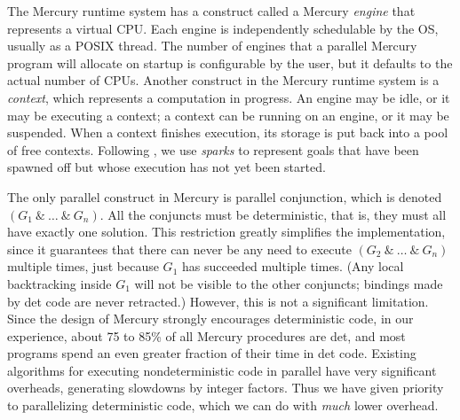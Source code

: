 The Mercury runtime system has a construct called a Mercury \emph{engine}
that represents a virtual CPU.
Each engine is independently schedulable by the OS, usually as a POSIX thread.
The number of engines that a parallel Mercury program will allocate on startup
is configurable by the user,
but it defaults to the actual number of CPUs.
Another construct in the Mercury runtime system is a \emph{context},
which represents a computation in progress.
An engine may be idle, or it may be executing a context;
a context can be running on an engine, or it may be suspended.
When a context finishes execution,
its storage is put back into a pool of free contexts.
Following \cite{simonmar_2009_multicore_rts},
we use \emph{sparks} to represent goals that have been spawned off
but whose execution has not yet been started.

The only parallel construct in Mercury is parallel conjunction,
which is denoted $(G_1~\&~\ldots~\&~G_n)$.
All the conjuncts must be deterministic,
that is, they must all have exactly one solution.
This restriction greatly simplifies the implementation,
since it guarantees that there can never be any need
to execute $(G_2~\&~\ldots~\&~G_n)$ multiple times,
just because $G_1$ has succeeded multiple times.
(Any local backtracking inside $G_1$ will not be visible to the other conjuncts;
bindings made by det code are never retracted.)
However, this is not a significant limitation.
Since the design of Mercury strongly encourages deterministic code,
in our experience, about 75 to 85\% of all Mercury procedures are det,
and most programs spend an even greater fraction of their time in det code.
Existing algorithms for executing nondeterministic code in parallel
have very significant overheads, generating slowdowns by integer factors.
Thus we have given priority to parallelizing deterministic code,
which we can do with \emph{much} lower overhead.

